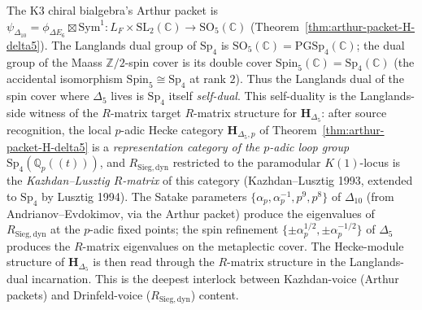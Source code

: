\begin{remark}
\label{rem:arthur-packet-langlands-dual-R-matrix}
The K3 chiral bialgebra's Arthur packet is $\psi_{\Delta_{10}} = \phi_{\Delta E_6}
\boxtimes \mathrm{Sym}^1 \colon L_F\times\mathrm{SL}_2(\mathbb{C}) \to
\mathrm{SO}_5(\mathbb{C})$ (Theorem~\ref{thm:arthur-packet-H-delta5}). The
Langlands dual group of $\mathrm{Sp}_4$ is $\mathrm{SO}_5(\mathbb{C}) =
\mathrm{PGSp}_4(\mathbb{C})$; the dual group of the Maass $\mathbb{Z}/2$-spin cover
is its double cover $\mathrm{Spin}_5(\mathbb{C}) = \mathrm{Sp}_4(\mathbb{C})$ (the
accidental isomorphism $\mathrm{Spin}_5 \cong \mathrm{Sp}_4$ at rank $2$). Thus the
Langlands dual of the spin cover where $\Delta_5$ lives is $\mathrm{Sp}_4$ itself
\emph{self-dual}. This self-duality is the Langlands-side witness of the $R$-matrix
target $R$-matrix structure for $\mathbf{H}_{\Delta_5}$: after source
recognition, the local $p$-adic Hecke category
$\mathbf{H}_{\Delta_5, p}$ of Theorem~\ref{thm:arthur-packet-H-delta5} is a
\emph{representation category of the $p$-adic loop group} $\mathrm{Sp}_4(\mathbb{Q}_p
((t)))$, and $R_{\mathrm{Sieg,dyn}}$ restricted to the paramodular $K(1)$-locus is the
\emph{Kazhdan--Lusztig $R$-matrix} of this category (Kazhdan--Lusztig 1993, extended
to $\mathrm{Sp}_4$ by Lusztig 1994). The Satake parameters $\{\alpha_p, \alpha_p^{-1},
p^9, p^8\}$ of $\Delta_{10}$ (from Andrianov--Evdokimov, via the Arthur packet)
produce the eigenvalues of $R_{\mathrm{Sieg,dyn}}$ at the $p$-adic fixed points; the
spin refinement $\{\pm\alpha_p^{1/2},\pm\alpha_p^{-1/2}\}$ of $\Delta_5$ produces the
$R$-matrix eigenvalues on the metaplectic cover. The Hecke-module structure of
$\mathbf{H}_{\Delta_5}$ is then read through the $R$-matrix structure in the
Langlands-dual incarnation. This is the deepest interlock between Kazhdan-voice
(Arthur packets) and Drinfeld-voice ($R_{\mathrm{Sieg,dyn}}$) content.
\end{remark}

